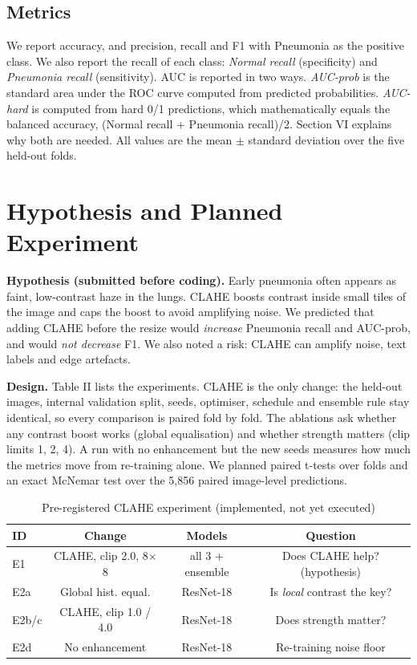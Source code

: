 \documentclass[conference]{IEEEtran}
\begin{document}
\subsection{Metrics}
We report accuracy, and precision, recall and F1 with Pneumonia as the positive class. We also report the recall of each class: \textit{Normal recall} (specificity) and \textit{Pneumonia recall} (sensitivity). AUC is reported in two ways. \textit{AUC-prob} is the standard area under the ROC curve computed from predicted probabilities. \textit{AUC-hard} is computed from hard 0/1 predictions, which mathematically equals the balanced accuracy, (Normal recall + Pneumonia recall)/2. Section VI explains why both are needed. All values are the mean $\pm$ standard deviation over the five held-out folds.

\section{Hypothesis and Planned Experiment}
\textbf{Hypothesis (submitted before coding).} Early pneumonia often appears as faint, low-contrast haze in the lungs. CLAHE \cite{zuiderveld} boosts contrast inside small tiles of the image and caps the boost to avoid amplifying noise. We predicted that adding CLAHE before the resize would \textit{increase} Pneumonia recall and AUC-prob, and would \textit{not decrease} F1. We also noted a risk: CLAHE can amplify noise, text labels and edge artefacts.

\textbf{Design.} Table II lists the experiments. CLAHE is the only change: the held-out images, internal validation split, seeds, optimiser, schedule and ensemble rule stay identical, so every comparison is paired fold by fold. The ablations ask whether any contrast boost works (global equalisation) and whether strength matters (clip limits 1, 2, 4). A run with no enhancement but the new seeds measures how much the metrics move from re-training alone. We planned paired t-tests over folds and an exact McNemar test \cite{mcnemar} over the 5,856 paired image-level predictions.

\begin{table}[!t]
\caption{Pre-registered CLAHE experiment (implemented, not yet executed)}
\centering
\footnotesize
\setlength{\tabcolsep}{3pt}
\begin{tabular}{lccc}
\hline
\textbf{ID} & \textbf{Change} & \textbf{Models} & \textbf{Question} \\
\hline
E1 & CLAHE, clip 2.0, 8$\times$8 & all 3 + ensemble & Does CLAHE help? (hypothesis) \\
E2a & Global hist. equal. & ResNet-18 & Is \textit{local} contrast the key? \\
E2b/c & CLAHE, clip 1.0 / 4.0 & ResNet-18 & Does strength matter? \\
E2d & No enhancement & ResNet-18 & Re-training noise floor \\
\hline
\end{tabular}
\end{table}
\end{document}
